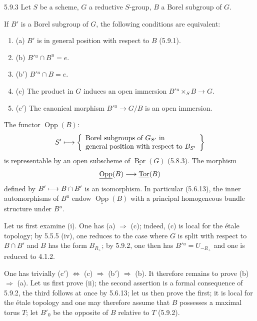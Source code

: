 \begin{proposition}{5.9.3}\label{XXII.5.9.3}
Let $S$ be a scheme, $G$ a reductive $S$-group, $B$ a Borel subgroup of $G$.
\begin{enumeratei}
\item If $B'$ is a Borel subgroup of $G$, the following conditions are equivalent:
\begin{enumerate}[label={}]
\item (a) $B'$ is in general position with respect to $B$ (5.9.1).
\item (b) $B'{}^u\cap B^u=e$.
\item (b$'$) $B'{}^u\cap B=e$.
\item (c) The product in $G$ induces an open immersion $B'{}^u\times_S B\to G$.
\item (c$'$) The canonical morphism $B'{}^u\to G/B$ is an open immersion.
\end{enumerate}
\item The functor $\underline{\operatorname{Opp}}(B)$:
\[
S'\longmapsto\left\{\begin{array}{l}\text{Borel subgroups of $G_{S'}$ in}\\
\text{general position with respect to $B_{S'}$}\end{array}\right\}
\]
is representable by an open subscheme of $\underline{\operatorname{Bor}}(G)$ (5.8.3). The morphism
\[
\underline{\operatorname{Opp}}(B)\longrightarrow\underline{\operatorname{Tor}}(B)
\]
defined by $B'\longmapsto B\cap B'$ is an isomorphism. In particular (5.6.13), the inner automorphisms of $B^u$ endow $\underline{\operatorname{Opp}}(B)$ with a principal homogeneous bundle structure under $B^u$.
\end{enumeratei}
\end{proposition}
Let us first examine (i). One has (a) $\Rightarrow$ (c); indeed, (c) is local for the \'etale topology; by 5.5.5 (iv), one reduces to the case where $G$ is split with respect to $B\cap B'$ and $B$ has the form $B_{R_+}$; by 5.9.2, one then has $B'{}^u=U_{-R_+}$ and one is reduced to 4.1.2.

One has trivially (c$'$) $\Leftrightarrow$ (c) $\Rightarrow$ (b$'$) $\Rightarrow$ (b). It therefore remains to prove (b) $\Rightarrow$ (a). Let us first prove (ii); the second assertion is a formal consequence of 5.9.2, the third follows at once by 5.6.13; let us then prove the first; it is local for the \'etale topology and one may therefore assume that $B$ possesses a maximal torus $T$; let $B'_0$ be the opposite of $B$ relative to $T$ (5.9.2).

